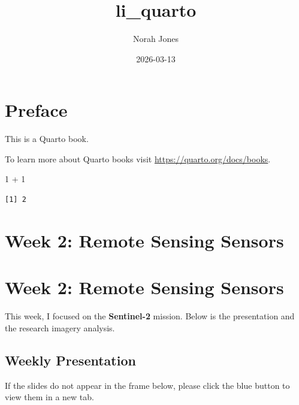 \documentclass[
  letterpaper,
  DIV=11,
  numbers=noendperiod]{scrreprt}
\title{li\_quarto}
\author{Norah Jones}
\date{2026-03-13}
\newenvironment{Shaded}{\begin{snugshade}}{\end{snugshade}}
\newcommand{\DecValTok}[1]{\textcolor[rgb]{0.68,0.00,0.00}{#1}}
\newcommand{\SpecialCharTok}[1]{\textcolor[rgb]{0.37,0.37,0.37}{#1}}
\renewcommand*\contentsname{Table of contents}
\newcommand\contentsname{Table of contents}
\begin{document}
\maketitle

\renewcommand*\contentsname{Table of contents}
{
\hypersetup{linkcolor=}
\setcounter{tocdepth}{2}
\tableofcontents
}


\chapter*{Preface}\label{preface}


This is a Quarto book.

To learn more about Quarto books visit
\url{https://quarto.org/docs/books}.

\begin{Shaded}
\begin{Highlighting}[]
\DecValTok{1} \SpecialCharTok{+} \DecValTok{1}
\end{Highlighting}
\end{Shaded}

\begin{verbatim}
[1] 2
\end{verbatim}


\chapter{Week 2: Remote Sensing
Sensors}\label{week-2-remote-sensing-sensors}


\chapter{Week 2: Remote Sensing
Sensors}\label{week-2-remote-sensing-sensors-1}

This week, I focused on the \textbf{Sentinel-2} mission. Below is the
presentation and the research imagery analysis.

\section{Weekly Presentation}\label{weekly-presentation}

If the slides do not appear in the frame below, please click the blue
button to view them in a new tab.
\end{document}
